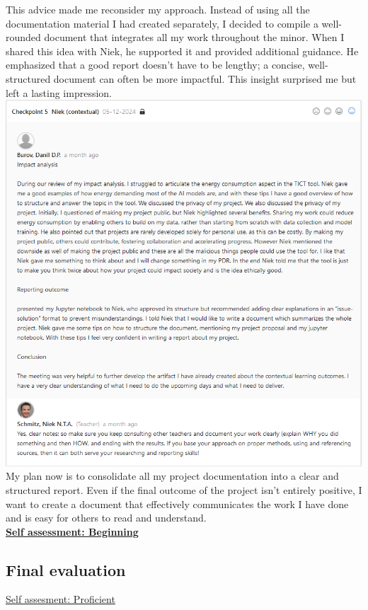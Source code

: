 \documentclass{article}
\begin{document}
This advice made me reconsider my approach. Instead of using all the documentation material I had created separately, I decided to compile a well-rounded document that integrates all my work throughout the minor. When I shared this idea with Niek, he supported it and provided additional guidance. He emphasized that a good report doesn’t have to be lengthy; a concise, well-structured document can often be more impactful. This insight surprised me but left a lasting impression.\\
\includegraphics[width=\textwidth,keepaspectratio]{images/Feedback_Niek_2.png}\\

My plan now is to consolidate all my project documentation into a clear and structured report. Even if the final outcome of the project isn’t entirely positive, I want to create a document that effectively communicates the work I have done and is easy for others to read and understand.\\
  \underline{\textbf{Self assessment: Beginning}}
\subsection{Final evaluation}
\underline{Self assesment: Proficient}
\end{document}
